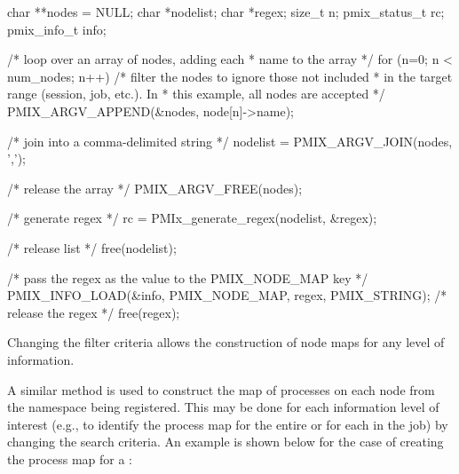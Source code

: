 \cspecificstart
\begin{codepar}
char **nodes = NULL;
char *nodelist;
char *regex;
size_t n;
pmix_status_t rc;
pmix_info_t info;

/* loop over an array of nodes, adding each
 * name to the array */
for (n=0; n < num_nodes; n++) {
    /* filter the nodes to ignore those not included
     * in the target range (session, job, etc.). In
     * this example, all nodes are accepted */
    PMIX_ARGV_APPEND(&nodes, node[n]->name);
}

/* join into a comma-delimited string */
nodelist = PMIX_ARGV_JOIN(nodes, ',');

/* release the array */
PMIX_ARGV_FREE(nodes);

/* generate regex */
rc = PMIx_generate_regex(nodelist, &regex);

/* release list */
free(nodelist);

/* pass the regex as the value to the PMIX_NODE_MAP key */
PMIX_INFO_LOAD(&info, PMIX_NODE_MAP, regex, PMIX_STRING);
/* release the regex */
free(regex);

\end{codepar}
\cspecificend

Changing the filter criteria allows the construction of node maps for any level of information.

\label{cptr:api_server:ppnregex}A similar method is used to construct the map of processes on each node from the namespace being registered. This may be done for each information level of interest (e.g., to identify the process map for the entire  or for each  in the job) by changing the search criteria. An example is shown below for the case of creating the process map for a :

